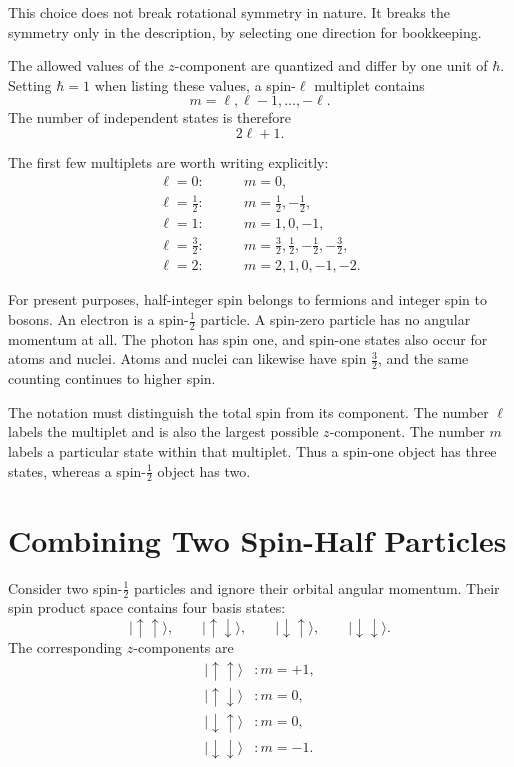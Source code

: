 This choice does not break rotational symmetry in nature. It breaks the symmetry only in the description, by selecting one direction for bookkeeping.

The allowed values of the \(z\)-component are quantized and differ by one unit of \(\hbar\). Setting \(\hbar=1\) when listing these values, a spin-\(\ell\) multiplet contains
\begin{equation}
m=\ell,\ell-1,\ldots,-\ell.
\end{equation}
The number of independent states is therefore
\begin{equation}
2\ell+1.
\end{equation}

The first few multiplets are worth writing explicitly:
\begin{align}
\ell=0:&\qquad m=0,\\
\ell=\frac12:&\qquad m=\frac12,-\frac12,\\
\ell=1:&\qquad m=1,0,-1,\\
\ell=\frac32:&\qquad
m=\frac32,\frac12,-\frac12,-\frac32,\\
\ell=2:&\qquad m=2,1,0,-1,-2.
\end{align}

For present purposes, half-integer spin belongs to fermions and integer spin to bosons. An electron is a spin-\(\tfrac12\) particle. A spin-zero particle has no angular momentum at all. The photon has spin one, and spin-one states also occur for atoms and nuclei. Atoms and nuclei can likewise have spin \(\tfrac32\), and the same counting continues to higher spin.

The notation must distinguish the total spin from its component. The number \(\ell\) labels the multiplet and is also the largest possible \(z\)-component. The number \(m\) labels a particular state within that multiplet. Thus a spin-one object has three states, whereas a spin-\(\tfrac12\) object has two.

\section{Combining Two Spin-Half Particles}

Consider two spin-\(\tfrac12\) particles and ignore their orbital angular momentum. Their spin product space contains four basis states:
\begin{equation}
|\uparrow\uparrow\rangle,\qquad
|\uparrow\downarrow\rangle,\qquad
|\downarrow\uparrow\rangle,\qquad
|\downarrow\downarrow\rangle.
\end{equation}
The corresponding \(z\)-components are
\begin{align}
|\uparrow\uparrow\rangle &: m=+1,\\
|\uparrow\downarrow\rangle &: m=0,\\
|\downarrow\uparrow\rangle &: m=0,\\
|\downarrow\downarrow\rangle &: m=-1.
\end{align}

